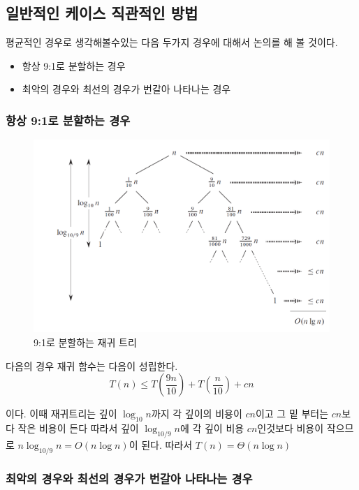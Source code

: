 \subsection{일반적인 케이스 직관적인 방법} 
평균적인 경우로 생각해볼수있는 다음 두가지 경우에 대해서 논의를 해 볼 것이다.
\begin{itemize}
    \item 항상 9:1로 분할하는 경우
    \item 최악의 경우와 최선의 경우가 번갈아 나타나는 경우
\end{itemize}

\subsubsection{항상 9:1로 분할하는 경우}

\begin{figure}[h!]
    \raggedleft
    \includegraphics[scale=0.4]{pic/q9.png}
    \caption{9:1로 분할하는 재귀 트리\cite{reference1}}
\end{figure}
다음의 경우 재귀 함수는 다음이 성립한다.
$$T(n) \le T\left(\dfrac{9n}{10}\right) + T\left(\dfrac{n}{10}\right)+ cn$$


이다. 
이때 재귀트리는 깊이 $\log_{10}n$까지 각 깊이의 비용이 $cn$이고 그 밑 부터는 $cn$보다 작은 비용이 든다 따라서 깊이 $\log_{10/9}n$에 각 깊이 비용 $cn$인것보다 비용이 작으므로 $n\log_{10/9}n = O(n \log n)$이 된다. 따라서 $T(n) = \Theta(n \log n)$


\subsubsection{최악의 경우와 최선의 경우가 번갈아 나타나는 경우}

